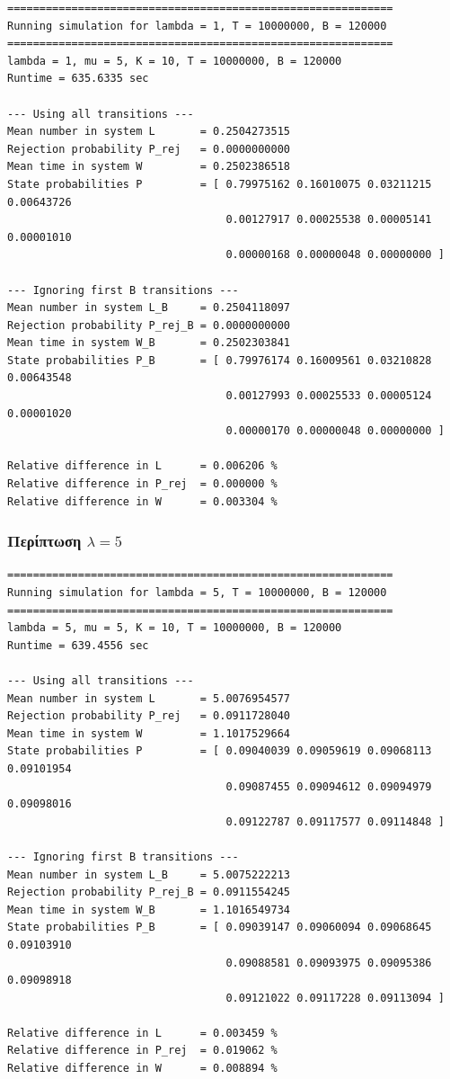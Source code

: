 \documentclass{article}
\begin{document}
{
\begin{verbatim}
============================================================
Running simulation for lambda = 1, T = 10000000, B = 120000
============================================================
lambda = 1, mu = 5, K = 10, T = 10000000, B = 120000
Runtime = 635.6335 sec

--- Using all transitions ---
Mean number in system L       = 0.2504273515
Rejection probability P_rej   = 0.0000000000
Mean time in system W         = 0.2502386518
State probabilities P         = [ 0.79975162 0.16010075 0.03211215 0.00643726
                                  0.00127917 0.00025538 0.00005141 0.00001010
                                  0.00000168 0.00000048 0.00000000 ]

--- Ignoring first B transitions ---
Mean number in system L_B     = 0.2504118097
Rejection probability P_rej_B = 0.0000000000
Mean time in system W_B       = 0.2502303841
State probabilities P_B       = [ 0.79976174 0.16009561 0.03210828 0.00643548
                                  0.00127993 0.00025533 0.00005124 0.00001020
                                  0.00000170 0.00000048 0.00000000 ]

Relative difference in L      = 0.006206 %
Relative difference in P_rej  = 0.000000 %
Relative difference in W      = 0.003304 %
\end{verbatim}
}

\subsubsection*{Περίπτωση $\lambda = 5$}

{
\begin{verbatim}
============================================================
Running simulation for lambda = 5, T = 10000000, B = 120000
============================================================
lambda = 5, mu = 5, K = 10, T = 10000000, B = 120000
Runtime = 639.4556 sec

--- Using all transitions ---
Mean number in system L       = 5.0076954577
Rejection probability P_rej   = 0.0911728040
Mean time in system W         = 1.1017529664
State probabilities P         = [ 0.09040039 0.09059619 0.09068113 0.09101954
                                  0.09087455 0.09094612 0.09094979 0.09098016
                                  0.09122787 0.09117577 0.09114848 ]

--- Ignoring first B transitions ---
Mean number in system L_B     = 5.0075222213
Rejection probability P_rej_B = 0.0911554245
Mean time in system W_B       = 1.1016549734
State probabilities P_B       = [ 0.09039147 0.09060094 0.09068645 0.09103910
                                  0.09088581 0.09093975 0.09095386 0.09098918
                                  0.09121022 0.09117228 0.09113094 ]

Relative difference in L      = 0.003459 %
Relative difference in P_rej  = 0.019062 %
Relative difference in W      = 0.008894 %
\end{verbatim}
}
\end{document}

